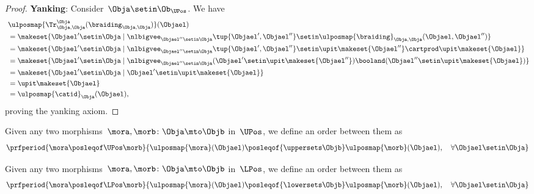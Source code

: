 \begin{proof}
    \textbf{Yanking}:
    Consider~$\Obja\setin \Ob_{\UPos}$.
    We have
    \begin{equation}
        \begin{aligned}
            ~ & \ulposmap{\Tr_{\Obja,\Obja}^{\Obja}(\braiding_{\Obja,\Obja})}(\Objael) \\
              & =\makeset{ \Objael'\setin \Obja \mid \nlbigvee_{\Objael''\setin \Obja}\tup{\Objael',\Objael''}\setin \ulposmap{\braiding}_{\Obja,\Obja}(\Objael,\Objael'')} \\
              & =\makeset{ \Objael'\setin \Obja \mid \nlbigvee_{\Objael''\setin \Obja}\tup{\Objael',\Objael''}\setin \upit\makeset{\Objael''}\cartprod \upit\makeset{ \Objael}} \\
              & =\makeset{ \Objael'\setin \Obja \mid \nlbigvee_{\Objael''\setin \Obja} (\Objael'\setin \upit\makeset{\Objael''}) \booland(\Objael'' \setin \upit\makeset{ \Objael})} \\
              & =\makeset{ \Objael'\setin \Obja \mid \Objael'\setin \upit\makeset{\Objael}} \\
              & =\upit \makeset{\Objael} \\
              & =\ulposmap{\catid}_\Obja(\Objael),
        \end{aligned}
    \end{equation}
    proving the yanking axiom.
\end{proof}

\begin{definition}
    \label{def:upos_order}
    Given any two morphisms~$\mora,\morb\colon \Obja \mto \Objb$ in~$\UPos$, we define an order between them as
    \begin{equation}
        \prfperiod{\mora \posleqof\UPos \morb}{\ulposmap{\mora}(\Objael)\posleqof{\uppersets \Objb} \ulposmap{\morb}(\Objael), \quad \forall \Objael \setin \Obja}
    \end{equation}
\end{definition}

\begin{definition}
    \label{def:lpos_order}
    Given any two morphisms~$\mora,\morb\colon \Obja \mto \Objb$ in~$\LPos$, we define an order between them as
    \begin{equation}
        \prfperiod{\mora \posleqof\LPos \morb}{\ulposmap{\mora}(\Objael)\posleqof{\lowersets \Objb} \ulposmap{\morb}(\Objael), \quad \forall \Objael \setin \Obja}
    \end{equation}
\end{definition}


